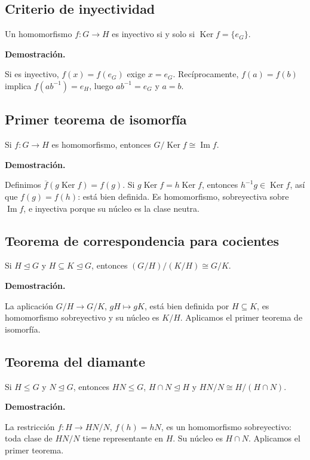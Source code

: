 \documentclass[11pt,a4paper]{article}
\newcommand{\Ker}{\operatorname{Ker}}\newcommand{\Imf}{\operatorname{Im}}\newcommand{\Aut}{\operatorname{Aut}}\newcommand{\mcd}{\operatorname{mcd}}\newcommand{\mcm}{\operatorname{mcm}}
\begin{document}
\subsection{Criterio de inyectividad}
\begin{resultado}
Un homomorfismo $f:G\to H$ es inyectivo si y solo si $\Ker f=\{e_G\}$.
\end{resultado}
\textbf{Demostración.}
\begin{demostracion}
Si es inyectivo, $f(x)=f(e_G)$ exige $x=e_G$. Recíprocamente, $f(a)=f(b)$ implica $f(ab^{-1})=e_H$, luego $ab^{-1}=e_G$ y $a=b$.
\end{demostracion}


\subsection{Primer teorema de isomorfía}
\begin{resultado}
Si $f:G\to H$ es homomorfismo, entonces $G/\Ker f\cong\Imf f$.
\end{resultado}
\textbf{Demostración.}
\begin{demostracion}
Definimos $\overline f(g\Ker f)=f(g)$. Si $g\Ker f=h\Ker f$, entonces $h^{-1}g\in\Ker f$, así que $f(g)=f(h)$: está bien definida. Es homomorfismo, sobreyectiva sobre $\Imf f$, e inyectiva porque su núcleo es la clase neutra.
\end{demostracion}


\subsection{Teorema de correspondencia para cocientes}
\begin{resultado}
Si $H\trianglelefteq G$ y $H\subseteq K\trianglelefteq G$, entonces $(G/H)/(K/H)\cong G/K$.
\end{resultado}
\textbf{Demostración.}
\begin{demostracion}
La aplicación $G/H\to G/K$, $gH\mapsto gK$, está bien definida por $H\subseteq K$, es homomorfismo sobreyectivo y su núcleo es $K/H$. Aplicamos el primer teorema de isomorfía.
\end{demostracion}


\subsection{Teorema del diamante}
\begin{resultado}
Si $H\le G$ y $N\trianglelefteq G$, entonces $HN\le G$, $H\cap N\trianglelefteq H$ y $HN/N\cong H/(H\cap N)$.
\end{resultado}
\textbf{Demostración.}
\begin{demostracion}
La restricción $f:H\to HN/N$, $f(h)=hN$, es un homomorfismo sobreyectivo: toda clase de $HN/N$ tiene representante en $H$. Su núcleo es $H\cap N$. Aplicamos el primer teorema.
\end{demostracion}
\end{document}
